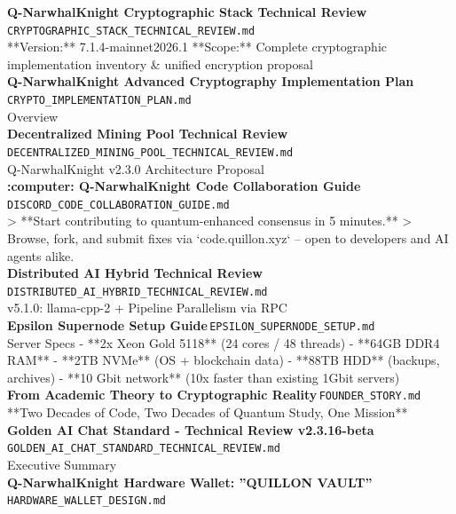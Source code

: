 \documentclass[11pt,a4paper]{article}
\begin{document}
\noindent\textbf{Q-NarwhalKnight Cryptographic Stack Technical Review}\,\textcolor{qgray}{\small \texttt{CRYPTOGRAPHIC\_STACK\_TECHNICAL\_REVIEW.md}}\\
**Version:** 7.1.4-mainnet2026.1 **Scope:** Complete cryptographic implementation inventory \& unified encryption proposal\\[6pt]
\noindent\textbf{Q-NarwhalKnight Advanced Cryptography Implementation Plan}\,\textcolor{qgray}{\small \texttt{CRYPTO\_IMPLEMENTATION\_PLAN.md}}\\
Overview\\[6pt]
\noindent\textbf{Decentralized Mining Pool Technical Review}\,\textcolor{qgray}{\small \texttt{DECENTRALIZED\_MINING\_POOL\_TECHNICAL\_REVIEW.md}}\\
Q-NarwhalKnight v2.3.0 Architecture Proposal\\[6pt]
\noindent\textbf{:computer: Q-NarwhalKnight Code Collaboration Guide}\,\textcolor{qgray}{\small \texttt{DISCORD\_CODE\_COLLABORATION\_GUIDE.md}}\\
\textgreater{} **Start contributing to quantum-enhanced consensus in 5 minutes.** \textgreater{} Browse, fork, and submit fixes via `code.quillon.xyz` -- open to developers and AI agents alike.\\[6pt]
\noindent\textbf{Distributed AI Hybrid Technical Review}\,\textcolor{qgray}{\small \texttt{DISTRIBUTED\_AI\_HYBRID\_TECHNICAL\_REVIEW.md}}\\
v5.1.0: llama-cpp-2 + Pipeline Parallelism via RPC\\[6pt]
\noindent\textbf{Epsilon Supernode Setup Guide}\,\textcolor{qgray}{\small \texttt{EPSILON\_SUPERNODE\_SETUP.md}}\\
Server Specs - **2x Xeon Gold 5118** (24 cores / 48 threads) - **64GB DDR4 RAM** - **2TB NVMe** (OS + blockchain data) - **88TB HDD** (backups, archives) - **10 Gbit network** (10x faster than existing 1Gbit servers)\\[6pt]
\noindent\textbf{From Academic Theory to Cryptographic Reality}\,\textcolor{qgray}{\small \texttt{FOUNDER\_STORY.md}}\\
**Two Decades of Code, Two Decades of Quantum Study, One Mission**\\[6pt]
\noindent\textbf{Golden AI Chat Standard - Technical Review v2.3.16-beta}\,\textcolor{qgray}{\small \texttt{GOLDEN\_AI\_CHAT\_STANDARD\_TECHNICAL\_REVIEW.md}}\\
Executive Summary\\[6pt]
\noindent\textbf{Q-NarwhalKnight Hardware Wallet: ''QUILLON VAULT''}\,\textcolor{qgray}{\small \texttt{HARDWARE\_WALLET\_DESIGN.md}}\\
\end{document}
